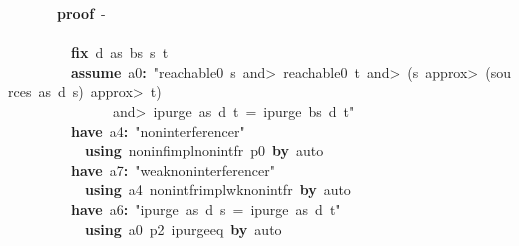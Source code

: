 \documentclass{article}
\newcommand{\syntaxKEYWORDA}[1]{\textcolor[rgb]{0.0,0.4,0.6}{\textbf{#1}}}
\newcommand{\syntaxKEYWORDC}[1]{\textcolor[rgb]{0.0,0.6,1.0}{\textbf{#1}}}
\newcommand{\syntaxLITERALA}[1]{\textcolor[rgb]{1.0,0.0,0.8}{#1}}
\newcommand{\syntaxOPERATOR}[1]{\textcolor[rgb]{0.0,0.0,0.0}{\textbf{#1}}}
\newcommand{\syntaxKEYWORDA}[1]{\textcolor[rgb]{0.0,0.4,0.6}{\textbf{#1}}}
\newcommand{\syntaxKEYWORDC}[1]{\textcolor[rgb]{0.0,0.6,1.0}{\textbf{#1}}}
\newcommand{\syntaxLITERALA}[1]{\textcolor[rgb]{1.0,0.0,0.8}{#1}}
\newcommand{\syntaxOPERATOR}[1]{\textcolor[rgb]{0.0,0.0,0.0}{\textbf{#1}}}
\newcommand{\syntaxKEYWORDA}[1]{\textcolor[rgb]{0.0,0.4,0.6}{\textbf{#1}}}
\newcommand{\syntaxKEYWORDC}[1]{\textcolor[rgb]{0.0,0.6,1.0}{\textbf{#1}}}
\newcommand{\syntaxLITERALA}[1]{\textcolor[rgb]{1.0,0.0,0.8}{#1}}
\newcommand{\syntaxOPERATOR}[1]{\textcolor[rgb]{0.0,0.0,0.0}{\textbf{#1}}}
\newcommand{\syntaxKEYWORDA}[1]{\textcolor[rgb]{0.0,0.4,0.6}{#1}}
\newcommand{\syntaxKEYWORDC}[1]{\textcolor[rgb]{0.0,0.6,1.0}{#1}}
\newcommand{\syntaxLITERALA}[1]{\textcolor[rgb]{1.0,0.0,0.8}{\textbf{#1}}}
\newcommand{\syntaxOPERATOR}[1]{\textcolor[rgb]{0.0,0.0,0.0}{#1}}
\newcommand{\syntaxKEYWORDA}[1]{\textcolor[rgb]{0.0,0.4,0.6}{\textbf{#1}}}
\newcommand{\syntaxKEYWORDC}[1]{\textcolor[rgb]{0.0,0.6,1.0}{\textbf{#1}}}
\newcommand{\syntaxLITERALA}[1]{\textcolor[rgb]{1.0,0.0,0.8}{#1}}
\newcommand{\syntaxOPERATOR}[1]{\textcolor[rgb]{0.0,0.0,0.0}{\textbf{#1}}}
\newcommand{\syntaxKEYWORDA}[1]{\textcolor[rgb]{0.0,0.4,0.6}{\textbf{#1}}}
\newcommand{\syntaxKEYWORDC}[1]{\textcolor[rgb]{0.0,0.6,1.0}{\textbf{#1}}}
\newcommand{\syntaxLITERALA}[1]{\textcolor[rgb]{1.0,0.0,0.8}{#1}}
\newcommand{\syntaxOPERATOR}[1]{\textcolor[rgb]{0.0,0.0,0.0}{\textbf{#1}}}
\begin{document}
{\ }{\ }{\ }{\ }{\ }{\ }{\ }\syntaxKEYWORDA{proof}{\ }{-}\hspace*{\fill}\\
{\ }{\ }{\ }{\ }{\ }{\ }{\ }\syntaxKEYWORDA{\usebox{\opencurlybracket}}\hspace*{\fill}\\
{\ }{\ }{\ }{\ }{\ }{\ }{\ }{\ }{\ }\syntaxKEYWORDC{fix}{\ }d{\ }as{\ }bs{\ }s{\ }t\hspace*{\fill}\\
{\ }{\ }{\ }{\ }{\ }{\ }{\ }{\ }{\ }\syntaxKEYWORDC{assume}{\ }a0\syntaxOPERATOR{:}{\ }\syntaxLITERALA{"reachable0{\ }s{\ }\<and>{\ }reachable0{\ }t{\ }\<and>{\ }(s{\ }\<approx>{\ }(sources{\ }as{\ }d{\ }s){\ }\<approx>{\ }t){\ }}\hspace*{\fill}\\
\syntaxLITERALA{{\ }{\ }{\ }{\ }{\ }{\ }{\ }{\ }{\ }{\ }{\ }{\ }{\ }{\ }{\ }\<and>{\ }ipurge{\ }as{\ }d{\ }t{\ }={\ }ipurge{\ }bs{\ }d{\ }t"}\hspace*{\fill}\\
{\ }{\ }{\ }{\ }{\ }{\ }{\ }{\ }{\ }\syntaxKEYWORDA{have}{\ }a4\syntaxOPERATOR{:}{\ }\syntaxLITERALA{"noninterference\usebox{\underscorebox}r"}\hspace*{\fill}\\
{\ }{\ }{\ }{\ }{\ }{\ }{\ }{\ }{\ }{\ }{\ }\syntaxKEYWORDA{using}{\ }noninf\usebox{\underscorebox}impl\usebox{\underscorebox}nonintf\usebox{\underscorebox}r{\ }p0{\ }\syntaxKEYWORDA{by}{\ }auto\hspace*{\fill}\\
{\ }{\ }{\ }{\ }{\ }{\ }{\ }{\ }{\ }\syntaxKEYWORDA{have}{\ }a7\syntaxOPERATOR{:}{\ }\syntaxLITERALA{"weak\usebox{\underscorebox}noninterference\usebox{\underscorebox}r"}\hspace*{\fill}\\
{\ }{\ }{\ }{\ }{\ }{\ }{\ }{\ }{\ }{\ }{\ }\syntaxKEYWORDA{using}{\ }a4{\ }nonintf\usebox{\underscorebox}r\usebox{\underscorebox}impl\usebox{\underscorebox}wk\usebox{\underscorebox}nonintf\usebox{\underscorebox}r{\ }\syntaxKEYWORDA{by}{\ }auto{\ }{\ }\hspace*{\fill}\\
{\ }{\ }{\ }{\ }{\ }{\ }{\ }{\ }{\ }\syntaxKEYWORDA{have}{\ }a6\syntaxOPERATOR{:}{\ }\syntaxLITERALA{"ipurge{\ }as{\ }d{\ }s{\ }={\ }ipurge{\ }as{\ }d{\ }t"}\hspace*{\fill}\\
{\ }{\ }{\ }{\ }{\ }{\ }{\ }{\ }{\ }{\ }{\ }\syntaxKEYWORDA{using}{\ }a0{\ }p2{\ }ipurge\usebox{\underscorebox}eq{\ }\syntaxKEYWORDA{by}{\ }auto\hspace*{\fill}\\
\end{document}
